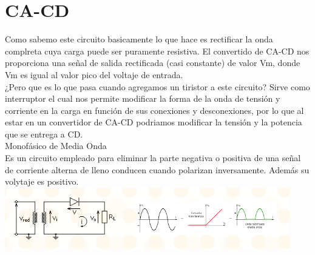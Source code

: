\documentclass[12pt,a4paper]{article}
\begin{document}
\section{CA-CD}
Como sabemo este circuito basicamente lo que hace es rectificar la onda complreta cuya carga puede ser puramente resistiva. El convertido de CA-CD nos proporciona una señal de salida rectificada (casi constante) de valor Vm, donde Vm es igual al valor pico del voltaje de entrada.\\
¿Pero que es lo que pasa cuando agregamos un tiristor a este circuito?
Sirve como interruptor el cual nos permite modificar la forma de la onda de tensión y corriente en la carga en función de sus conexiones y desconexiones, por lo que al estar en un convertidor de CA-CD podriamos modificar la tensión y la potencia que se entrega a CD.\\
Monofásico de Media Onda\\
Es un circuito empleado para eliminar la parte negativa o positiva de una señal de corriente alterna de lleno conducen cuando polarizan inversamente. Además su volytaje es positivo.
\centering
\includegraphics[scale=1]{Monofasico.png} 
\raggedright
\end{document}
